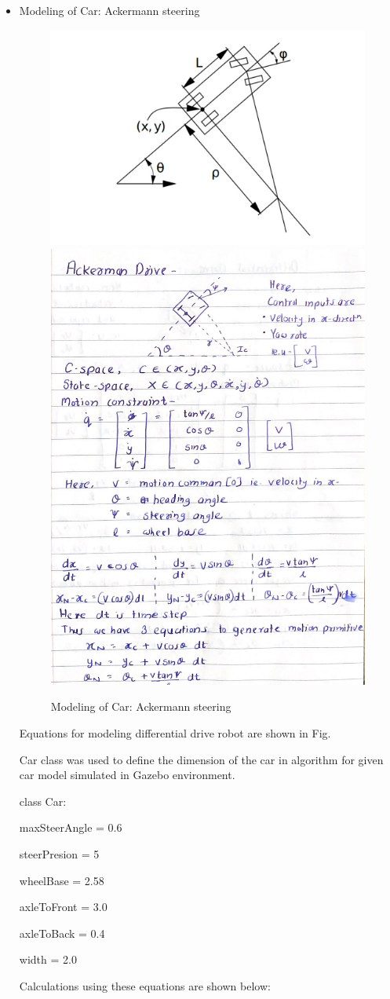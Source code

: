 \documentclass[12pt,a4paper]{article}
\begin{document}
\begin{itemize}
        
    \item Modeling of Car: Ackermann steering
        \begin{figure}[htbp!]
        \begin{center}
        \includegraphics[width=0.4\columnwidth]{images/model_car.jpeg}
        \includegraphics[width=0.4\columnwidth]{algorithm/car_model.png}
        \end{center}
        \caption{Modeling of Car: Ackermann steering}
        \label{fig:Occupancy_grid}
        \end{figure}
        Equations for modeling differential drive robot are shown in Fig.\par
        Car class was used to define the dimension of the car in algorithm for given car model simulated in Gazebo environment.
        \par
        class Car:\par
            maxSteerAngle = 0.6\par
            steerPresion = 5\par
            wheelBase = 2.58\par
            axleToFront = 3.0\par
            axleToBack = 0.4\par
            width = 2.0\par
        Calculations using these equations are shown below:
      

\end{itemize}
\end{document}
